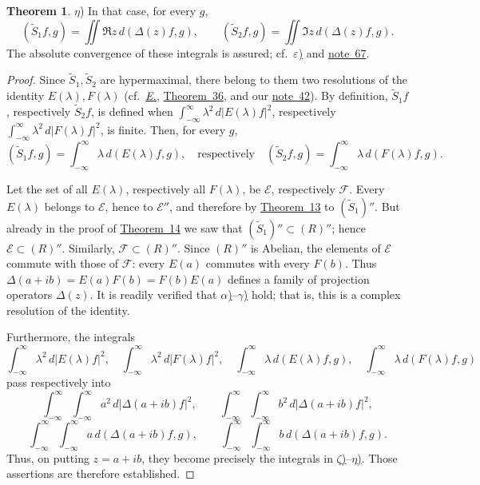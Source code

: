 \documentclass[
  paper=b5,
  twoside=true,
  fontsize=13pt,
  headings=normal,
  bookmarkpackage=false
]{scrartcl}
\theoremstyle{definition}
\newtheorem{theorem}{Theorem}
\newcommand{\NoteRef}[1]{\hyperref[fn:#1]{note~#1}}
\newcommand{\TheoremRef}[1]{\hyperref[thm:#1]{Theorem~#1}}
\newcommand{\Eref}{\hyperref[fn:E-paper]{\emph{E.}}}
\newcommand{\ErefText}[1]{\href{https://doi.org/10.1007/BF01782338}{#1}}
\begin{document}
\begin{theorem}
\label{thm:17:eta}%
\(\eta\)) In that case, for every \(g\),
\[
  (\widetilde S_1f,g)
  =\iint\Re z\,d(\Delta(z)f,g),\qquad
  (\widetilde S_2f,g)
  =\iint\Im z\,d(\Delta(z)f,g).
\]
The absolute convergence of these integrals is assured; cf.\
\hyperref[thm:17:epsilon]{\(\varepsilon\))} and \NoteRef{67}.
\end{theorem}

\begin{proof}
Since \(\widetilde S_1,\widetilde S_2\) are hypermaximal, there belong
to them two resolutions of the identity \(E(\lambda),F(\lambda)\)
(cf.\ \Eref, \ErefText{Theorem~36}, and our \NoteRef{42}).  By definition,
\(\widetilde S_1f\), respectively \(\widetilde S_2f\), is defined when
\(\int_{-\infty}^{\infty}\lambda^2\,d|E(\lambda)f|^2\), respectively
\(\int_{-\infty}^{\infty}\lambda^2\,d|F(\lambda)f|^2\), is finite.
Then, for every \(g\),
\[
  (\widetilde S_1f,g)
  =\int_{-\infty}^{\infty}\lambda\,d(E(\lambda)f,g),
  \quad\text{respectively}\quad
  (\widetilde S_2f,g)
  =\int_{-\infty}^{\infty}\lambda\,d(F(\lambda)f,g).
\]

Let the set of all \(E(\lambda)\), respectively all \(F(\lambda)\), be
\(\mathcal E\), respectively \(\mathcal F\).  Every \(E(\lambda)\)
belongs to \(\mathcal E\), hence to \(\mathcal E''\), and therefore by
\TheoremRef{13} to \((\widetilde S_1)''\).  But already in the
proof of \TheoremRef{14} we saw that
\((\widetilde S_1)''\subset(R)''\); hence
\(\mathcal E\subset(R)''\).  Similarly,
\(\mathcal F\subset(R)''\).  Since \((R)''\) is Abelian, the elements of
\(\mathcal E\) commute with those of \(\mathcal F\): every \(E(a)\)
commutes with every \(F(b)\).  Thus \(\Delta(a+ib)=E(a)F(b)=F(b)E(a)\) defines a family of
projection operators \(\Delta(z)\). It is readily verified that \hyperref[thm:17:alpha]{\(\alpha\))}--\hyperref[thm:17:gamma]{\(\gamma\))} hold; that is,
this is a complex resolution of the identity.

Furthermore, the integrals
\[
  \int_{-\infty}^{\infty}\lambda^2\,d|E(\lambda)f|^2,\quad
  \int_{-\infty}^{\infty}\lambda^2\,d|F(\lambda)f|^2,\quad
  \int_{-\infty}^{\infty}\lambda\,d(E(\lambda)f,g),\quad
  \int_{-\infty}^{\infty}\lambda\,d(F(\lambda)f,g)
\]
pass respectively into
\[
  \int_{-\infty}^{\infty}\int_{-\infty}^{\infty}
  a^2\,d|\Delta(a+ib)f|^2,
\qquad
  \int_{-\infty}^{\infty}\int_{-\infty}^{\infty}
  b^2\,d|\Delta(a+ib)f|^2,
\]
\[
  \int_{-\infty}^{\infty}\int_{-\infty}^{\infty}
  a\,d(\Delta(a+ib)f,g),
\qquad
  \int_{-\infty}^{\infty}\int_{-\infty}^{\infty}
  b\,d(\Delta(a+ib)f,g).
\]
Thus, on putting \(z=a+ib\), they become precisely the integrals in
\hyperref[thm:17:zeta]{\(\zeta\))}--\hyperref[thm:17:eta]{\(\eta\))}.  Those assertions are therefore established.


\end{proof}
\end{document}
